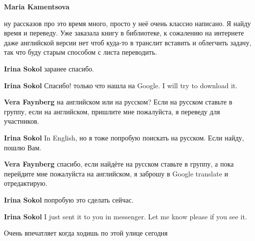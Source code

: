 \begin{itemize}
\begin{itemize}
\textbf{Maria Kamentsova} 

ну рассказов про это время много, просто у неё очень классно написано. Я найду
время и переведу. Уже заказала книгу в библиотеке, к сожалению на интернете
даже английской версии нет чтоб куда-то в транслит вставить и облегчить задачу,
так что буду старым способом с листа переводить.


\textbf{Irina Sokol} заранее спасибо.

\textbf{Irina Sokol} Спасибо! только что нашла на Google. I will try to download it.

\begin{itemize} %
\textbf{Vera Faynberg} на английском или на русском? Если на русском ставьте в группу, если на английском, пришлите мне пожалуйста, я переведу для участников.

\textbf{Irina Sokol} In English, но я тоже попробую поискать на русском. Если найду, пошлю Вам.

\textbf{Vera Faynberg} спасибо, если найдёте на русском ставьте в группу, а пока перейдите мне пожалуйста на английском, я заброшу в Google translate и отредактирую.

\textbf{Irina Sokol} попробую это сделать сейчас.

\textbf{Irina Sokol} I just sent it to you in messenger. Let me know please if you see it.

\end{itemize} %

\end{itemize} %

Очень впечатляет когда ходишь по этой улице сегодня

\end{itemize} %
